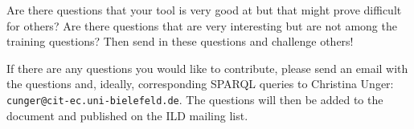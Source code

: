 
Are there questions that your tool is very good at but that might prove difficult for others? 
Are there questions that are very interesting but are not among the training questions? 
Then send in these questions and challenge others!

If there are any questions you would like to contribute, please send an email with the questions
and, ideally, corresponding SPARQL queries to Christina Unger: {\tt cunger@cit-ec.uni-bielefeld.de}. 
The questions will then be added to the document and published on the ILD mailing list.

